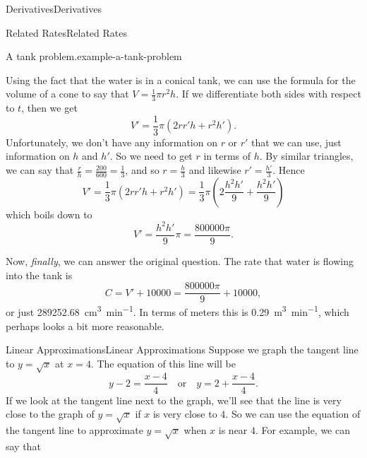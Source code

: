 \documentclass[10pt,]{book}
\numberwithin{equation}{section}
\begin{document}
\begin{chapterptx}{Derivatives}{}{Derivatives}{}{}
\begin{sectionptx}{Related Rates}{}{Related Rates}{}{}
\begin{example}{A tank problem.}{example-a-tank-problem}
\par
\hypertarget{p-174}{}%
Using the fact that the water is in a conical tank, we can use the formula for the volume of a cone to say that \(V = \frac{1}{3}\pi r^{2}h\). If we differentiate both sides with respect to \(t\), then we get%
\begin{equation*}
V' = \frac{1}{3}\pi (2rr'h + r^{2}h').
\end{equation*}
Unfortunately, we don't have any information on \(r\) or \(r'\) that we can use, just information on \(h\) and \(h'\). So we need to get \(r\) in terms of \(h\). By similar triangles, we can say that \(\frac{r}{h} = \frac{200}{600} = \frac{1}{3}\), and so \(r = \frac{h}{3}\) and likewise \(r' = \frac{h'}{3}\). Hence%
\begin{equation*}
V' = \frac{1}{3}\pi (2rr'h + r^{2}h') = \frac{1}{3}\pi \left(2\frac{h^{2}h'}{9} + \frac{h^{2}h'}{9}\right)
\end{equation*}
which boils down to%
\begin{equation*}
V' = \frac{h^{2}h'}{9}\pi = \frac{800000\pi}{9}.
\end{equation*}
%
\par
\hypertarget{p-175}{}%
Now, \emph{finally}, we can answer the original question. The rate that water is flowing into the tank is%
\begin{equation*}
C = V' + 10000 = \frac{800000\pi}{9} + 10000,
\end{equation*}
or just \SI{289252.68}{\centi\meter\tothe{3}\per\minute}. In terms of meters this is \SI{.29}{\meter\tothe{3}\per\minute}, which perhaps looks a bit more reasonable.%
\end{example}
\end{sectionptx}
%
%
\typeout{************************************************}
\typeout{************************************************}
%
\begin{sectionptx}{Linear Approximations}{}{Linear Approximations}{}{}\label{section-linear-approximations}
\hypertarget{p-176}{}%
Suppose we graph the tangent line to \(y=\sqrt{x}\) at \(x=4\). The equation of this line will be%
\begin{equation*}
y-2 = \frac{x-4}{4}\quad\text{or}\quad y= 2 + \frac{x-4}{4}.
\end{equation*}
If we look at the tangent line next to the graph, we'll see that the line is very close to the graph of \(y=\sqrt{x}\) if \(x\) is very close to \(4\). So we can use the equation of the tangent line to approximate \(y=\sqrt{x}\) when \(x\) is near \(4\). For example, we can say that%

\end{sectionptx}
\end{chapterptx}
\end{document}
